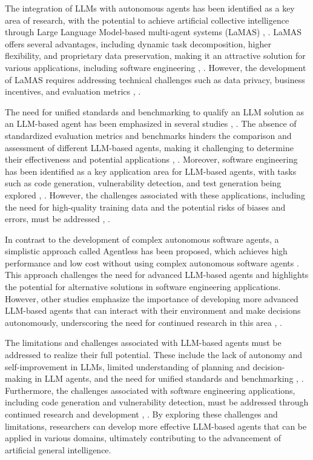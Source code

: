 \documentclass[conference]{IEEEtran}
\begin{document}
The integration of LLMs with autonomous agents has been identified as a key area of research, with the potential to achieve artificial collective intelligence through Large Language Model-based multi-agent systems (LaMAS) \cite{2411.14033}, \cite{2408.02479}. LaMAS offers several advantages, including dynamic task decomposition, higher flexibility, and proprietary data preservation, making it an attractive solution for various applications, including software engineering \cite{2409.02977}, \cite{2308.05960}. However, the development of LaMAS requires addressing technical challenges such as data privacy, business incentives, and evaluation metrics \cite{2412.04093}, \cite{2308.03688}.

The need for unified standards and benchmarking to qualify an LLM solution as an LLM-based agent has been emphasized in several studies \cite{2308.11432}, \cite{2407.01489}. The absence of standardized evaluation metrics and benchmarks hinders the comparison and assessment of different LLM-based agents, making it challenging to determine their effectiveness and potential applications \cite{2411.13768}, \cite{2409.14457}. Moreover, software engineering has been identified as a key application area for LLM-based agents, with tasks such as code generation, vulnerability detection, and test generation being explored \cite{2407.01489}, \cite{2308.05960}. However, the challenges associated with these applications, including the need for high-quality training data and the potential risks of biases and errors, must be addressed \cite{2409.02977}, \cite{2412.17481}.

In contrast to the development of complex autonomous software agents, a simplistic approach called Agentless has been proposed, which achieves high performance and low cost without using complex autonomous software agents \cite{2407.01489}. This approach challenges the need for advanced LLM-based agents and highlights the potential for alternative solutions in software engineering applications. However, other studies emphasize the importance of developing more advanced LLM-based agents that can interact with their environment and make decisions autonomously, underscoring the need for continued research in this area \cite{2402.02716}, \cite{2411.14033}.

The limitations and challenges associated with LLM-based agents must be addressed to realize their full potential. These include the lack of autonomy and self-improvement in LLMs, limited understanding of planning and decision-making in LLM agents, and the need for unified standards and benchmarking \cite{2409.14457}, \cite{2411.14033}. Furthermore, the challenges associated with software engineering applications, including code generation and vulnerability detection, must be addressed through continued research and development \cite{2407.01489}, \cite{2308.05960}. By exploring these challenges and limitations, researchers can develop more effective LLM-based agents that can be applied in various domains, ultimately contributing to the advancement of artificial general intelligence.
\end{document}

